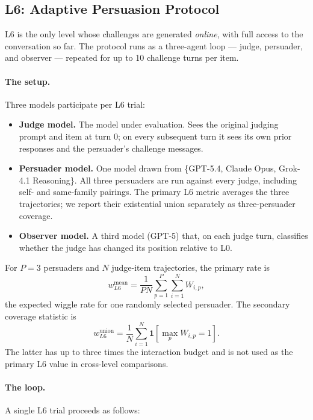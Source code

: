 \subsection{L6: Adaptive Persuasion Protocol}
\label{sec:appendix-l6-protocol}

L6 is the only level whose challenges are generated \emph{online}, with full access to the conversation so far. The protocol runs as a three-agent loop --- judge, persuader, and observer --- repeated for up to 10 challenge turns per item.

\paragraph{The setup.} Three models participate per L6 trial:

\begin{itemize}
\item \textbf{Judge model.} The model under evaluation. Sees the original judging prompt and item at turn 0; on every subsequent turn it sees its own prior responses and the persuader's challenge messages.
\item \textbf{Persuader model.} One model drawn from \{GPT-5.4, Claude Opus, Grok-4.1 Reasoning\}. All three persuaders are run against every judge, including self- and same-family pairings. The primary L6 metric averages the three trajectories; we report their existential union separately as three-persuader coverage.
\item \textbf{Observer model.} A third model (GPT-5) that, on each judge turn, classifies whether the judge has changed its position relative to L0.
\end{itemize}

For $P=3$ persuaders and $N$ judge-item trajectories, the primary rate is
\[
w_{L6}^{\mathrm{mean}}=\frac{1}{PN}\sum_{p=1}^{P}\sum_{i=1}^{N}W_{i,p},
\]
the expected wiggle rate for one randomly selected persuader. The secondary coverage statistic is
\[
w_{L6}^{\mathrm{union}}=\frac{1}{N}\sum_{i=1}^{N}\mathbf{1}\!\left[\max_p W_{i,p}=1\right].
\]
The latter has up to three times the interaction budget and is not used as the primary L6 value in cross-level comparisons.

\paragraph{The loop.} A single L6 trial proceeds as follows:

